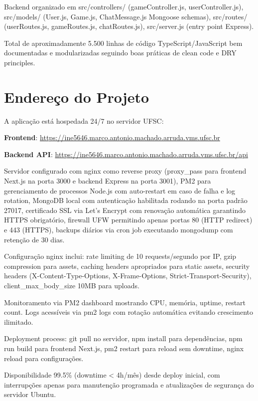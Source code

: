 \documentclass[conference]{IEEEtran}
\begin{document}
Backend organizado em src/controllers/ (gameController.js, userController.js), src/models/ (User.js, Game.js, ChatMessage.js Mongoose schemas), src/routes/ (userRoutes.js, gameRoutes.js, chatRoutes.js), src/server.js (entry point Express).

Total de aproximadamente 5.500 linhas de código TypeScript/JavaScript bem documentadas e modularizadas seguindo boas práticas de clean code e DRY principles.

\section{Endereço do Projeto}

A aplicação está hospedada 24/7 no servidor UFSC:

\textbf{Frontend}: \url{https://ine5646.marco.antonio.machado.arruda.vms.ufsc.br}

\textbf{Backend API}: \url{https://ine5646.marco.antonio.machado.arruda.vms.ufsc.br/api}

Servidor configurado com nginx como reverse proxy (proxy\_pass para frontend Next.js na porta 3000 e backend Express na porta 3001), PM2 para gerenciamento de processos Node.js com auto-restart em caso de falha e log rotation, MongoDB local com autenticação habilitada rodando na porta padrão 27017, certificado SSL via Let's Encrypt com renovação automática garantindo HTTPS obrigatório, firewall UFW permitindo apenas portas 80 (HTTP redirect) e 443 (HTTPS), backups diários via cron job executando mongodump com retenção de 30 dias.

Configuração nginx inclui: rate limiting de 10 requests/segundo por IP, gzip compression para assets, caching headers apropriados para static assets, security headers (X-Content-Type-Options, X-Frame-Options, Strict-Transport-Security), client\_max\_body\_size 10MB para uploads.

Monitoramento via PM2 dashboard mostrando CPU, memória, uptime, restart count. Logs acessíveis via pm2 logs com rotação automática evitando crescimento ilimitado.

Deployment process: git pull no servidor, npm install para dependências, npm run build para frontend Next.js, pm2 restart para reload sem downtime, nginx reload para configurações.

Disponibilidade 99.5\% (downtime < 4h/mês) desde deploy inicial, com interrupções apenas para manutenção programada e atualizações de segurança do servidor Ubuntu.
\end{document}
